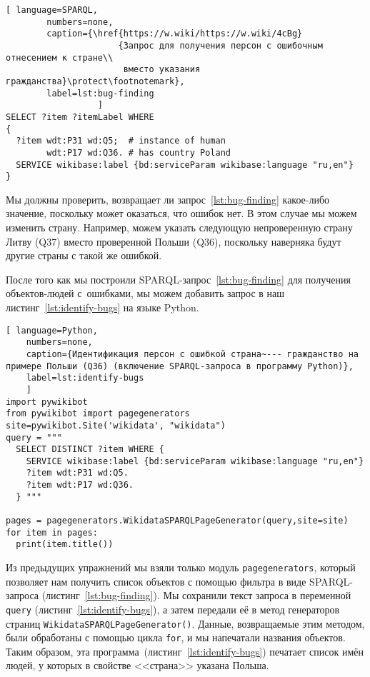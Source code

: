 \begin{lstlisting}[ language=SPARQL,
        numbers=none,
        caption={\href{https://w.wiki/https://w.wiki/4cBg}
                      {Запрос для получения персон с ошибочным отнесением к стране\\
                       вместо указания гражданства}\protect\footnotemark},
        label=lst:bug-finding
                  ]
SELECT ?item ?itemLabel WHERE 
{
  ?item wdt:P31 wd:Q5;  # instance of human
        wdt:P17 wd:Q36. # has country Poland
  SERVICE wikibase:label {bd:serviceParam wikibase:language "ru,en"}
}
\end{lstlisting}


\newpage
Мы должны проверить, возвращает ли запрос~\ref{lst:bug-finding} какое-либо значение, 
поскольку может оказаться, что ошибок нет. 
В этом случае мы можем изменить страну. 
Например, можем указать следующую непроверенную страну Литву (Q37) 
вместо проверенной Польши (Q36), 
поскольку наверняка будут другие страны с такой же ошибкой.

После того как мы построили SPARQL-запрос~\ref{lst:bug-finding} для получения объектов-людей с~ошибками, 
мы можем добавить запрос в наш листинг~\ref{lst:identify-bugs} на языке Python.

\begin{lstlisting}[ language=Python,
    numbers=none,
    caption={Идентификация персон с ошибкой страна~--- гражданство на примере Польши (Q36) (включение SPARQL-запроса в программу Python)},
    label=lst:identify-bugs
    ]
import pywikibot
from pywikibot import pagegenerators
site=pywikibot.Site('wikidata', "wikidata")
query = """
  SELECT DISTINCT ?item WHERE {
    SERVICE wikibase:label {bd:serviceParam wikibase:language "ru,en"}
    ?item wdt:P31 wd:Q5.
    ?item wdt:P17 wd:Q36.
  } """

pages = pagegenerators.WikidataSPARQLPageGenerator(query,site=site)
for item in pages:
  print(item.title())
\end{lstlisting}    

Из предыдущих упражнений мы взяли только модуль \lstinline|pagegenerators|, 
который позволяет нам получить список объектов с помощью фильтра в виде SPARQL-запроса 
(листинг~\ref{lst:bug-finding}). 
Мы сохранили текст запроса в переменной \lstinline|query| (листинг~\ref{lst:identify-bugs}), 
а затем передали её в метод генераторов страниц \lstinline|WikidataSPARQLPageGenerator()|. 
Данные, возвращаемые этим методом, были обработаны с помощью цикла \lstinline|for|, 
и мы напечатали названия объектов.
Таким образом, эта программа~(листинг~\ref{lst:identify-bugs}) печатает список имён людей, у которых в свойстве <<страна>> указана Польша.

